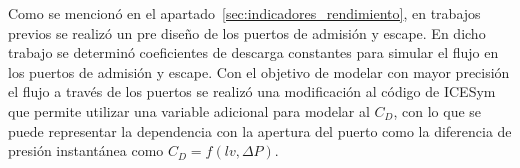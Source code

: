 Como se mencionó en el apartado~\ref{sec:indicadores_rendimiento}, en trabajos
previos se realizó un pre diseño de los puertos de admisión y escape.
%
En dicho trabajo se determinó coeficientes de descarga constantes
para simular el flujo en los puertos de admisión y escape.
%
Con el objetivo de modelar con mayor precisión el flujo a través de los puertos
se realizó una modificación al código de ICESym que permite utilizar una
variable adicional para modelar al $C_D$, con lo que se puede representar la
dependencia con la apertura del puerto como la diferencia de presión
instantánea como $C_D = f(lv, \Delta P)$.
